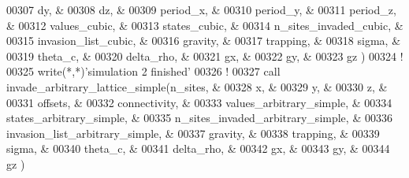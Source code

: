 \begin{DoxyCode}
00307                                dy,                    &
00308                                dz,                    &
00309                                period\_x,              &
00310                                period\_y,              &
00311                                period\_z,              &
00312                                values\_cubic,          &
00313                                states\_cubic,          &
00314                                n\_sites\_invaded\_cubic, &
00315                                invasion\_list\_cubic,   &
00316                                gravity,               &
00317                                trapping,              &
00318                                sigma,                 &
00319                                theta\_c,               &
00320                                delta\_rho,             &
00321                                gx,                    &
00322                                gy,                    &
00323                                gz                     )
00324 \textcolor{comment}{!}
00325 \textcolor{keyword}{write}(*,*)\textcolor{stringliteral}{'simulation 2 finished'}
00326 \textcolor{comment}{!}
00327 call invade\_arbitrary\_lattice\_simple(n\_sites,                          &
00328                                      x,                                &
00329                                      y,                                &
00330                                      z,                                &
00331                                      offsets,                          &
00332                                      connectivity,                     &
00333                                      values\_arbitrary\_simple,          &
00334                                      states\_arbitrary\_simple,          &
00335                                      n\_sites\_invaded\_arbitrary\_simple, &
00336                                      invasion\_list\_arbitrary\_simple,   &
00337                                      gravity,                          &
00338                                      trapping,                         &
00339                                      sigma,                            &
00340                                      theta\_c,                          &
00341                                      delta\_rho,                        &
00342                                      gx,                               &
00343                                      gy,                               &
00344                                      gz                                )

\end{DoxyCode}
